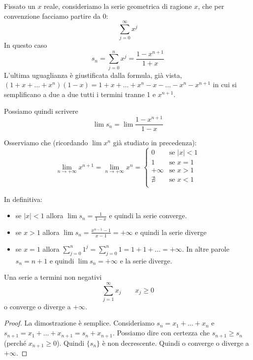 \begin{example}
Fissato un $x$ reale, consideriamo la serie geometrica di ragione $x$, che per convenzione facciamo partire da 0:
\begin{equation*}
\sum_{j=0}^\infty x^j
\end{equation*}
In questo caso
\begin{equation*}
s_n = \sum_{j=0}^n x^j = \frac{1-x^{n+1}}{1+x}
\end{equation*}
L'ultima uguaglianza è giustificata dalla formula, già vista, $(1+x+\ldots+x^n)(1-x) = 1 + x + \ldots + x^n - x - \ldots - x^n - x^{n+1}$ in cui si semplificano a due a due tutti i termini tranne 1 e $x^{n+1}$.
\end{example}
Possiamo quindi scrivere
\begin{equation*}
\lim s_n = \lim \frac{1-x^{n+1}}{1-x}
\end{equation*}

Osserviamo che (ricordando $\lim x^n$ già studiato in precedenza):
\begin{equation*}
\lim_{n \to +\infty}x^{n+1} = \lim_{n \to +\infty}x^n = 
\begin{cases}
0 & \mbox{se } |x| < 1 \\
1 & \mbox{se } x = 1 \\
+\infty & \mbox{se } x > 1 \\
\nexists & \mbox{se } x < 1 \\
\end{cases}
\end{equation*}

In definitiva:
\begin{itemize}
\item se $|x| < 1$ allora $\lim s_n = \frac{1}{1-x}$ e quindi la serie converge.
\item se $x > 1$ allora $\lim s_n = \frac{x^{n-1}-1}{x-1} = +\infty$ e quindi la serie diverge
\item se $x = 1$ allora $\sum_{j=0}^n 1^j = \sum_{j=0}^n 1 = 1 + 1 + \ldots = +\infty$. In altre parole $s_n=n+1$ e quindi $\lim s_n = +\infty$ e la serie diverge.
\end{itemize}

\begin{proposition}
Una serie a termini non negativi
\begin{equation*}
\sum_{j=1}^\infty x_j \qquad x_j \ge 0
\end{equation*}
o converge o diverge a $+\infty$.
\end{proposition}
\begin{proof}
La dimostrazione è semplice. Consideriamo $s_n = x_1 + \ldots + x_n$ e $s_{n+1} = x_1 + \ldots + x_{n+1} = s_n + x_{n+1}$. Possiamo dire con certezza che $s_{n+1} \ge s_n$ (perché $x_{n+1} \ge 0$). Quindi $\{s_n\}$  è non decrescente. Quindi o converge o diverge a $+\infty$.
\end{proof}


